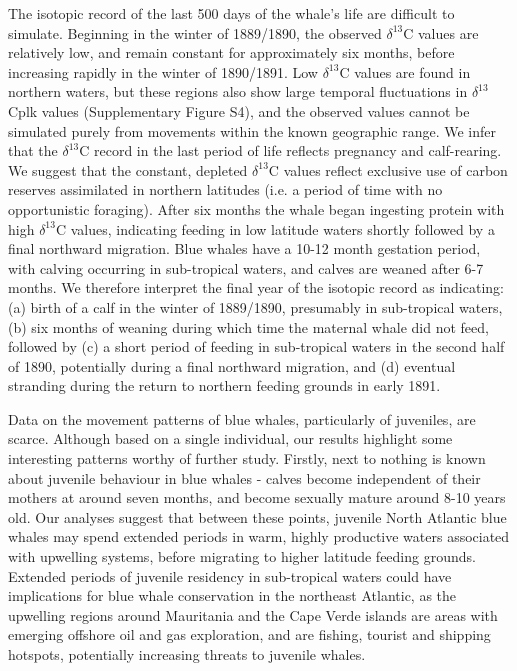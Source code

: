 \documentclass[a4paper,12pt]{article}
\begin{document}
The isotopic record of the last 500 days of the whale's life are difficult to simulate. 
Beginning in the winter of 1889/1890, the observed $\delta^{13}$C values are relatively low, and remain constant for approximately six months, before increasing rapidly in the winter of 1890/1891. 
Low $\delta^{13}$C values are found in northern waters, but these regions also show large temporal fluctuations in $\delta^{13}$Cplk values (Supplementary Figure S4), and the observed values cannot be simulated purely from movements within the known geographic range.
We infer that the $\delta^{13}$C record in the last period of life reflects pregnancy and calf-rearing. 
We suggest that the constant, depleted $\delta^{13}$C values reflect exclusive use of carbon reserves assimilated in northern latitudes (i.e. a period of time with no opportunistic foraging). 
After six months the whale began ingesting protein with high $\delta^{13}$C  values, indicating feeding in low latitude waters shortly followed by a final northward migration. 
Blue whales have a 10-12 month gestation period, with calving occurring in sub-tropical waters, and calves are weaned after 6-7 months\cite{handbook}. 
We therefore interpret the final year of the isotopic record as indicating: (a) birth of a calf in the winter of 1889/1890, presumably in sub-tropical waters, (b) six months of weaning during which time the maternal whale did not feed, followed by (c) a short period of feeding in sub-tropical waters in the second half of 1890, potentially during a final northward migration, and (d) eventual stranding during the return to northern feeding grounds in early 1891.

Data on the movement patterns of blue whales, particularly of juveniles, are scarce. 
Although based on a single individual, our results highlight some interesting patterns worthy of further study.
Firstly, next to nothing is known about juvenile behaviour in blue whales - calves become independent of their mothers at around seven months, and become sexually mature around 8-10 years old\cite{handbook}.
Our analyses suggest that between these points, juvenile North Atlantic blue whales may spend extended periods in warm, highly productive waters associated with upwelling systems, before migrating to higher latitude feeding grounds.
Extended periods of juvenile residency in sub-tropical waters could have implications for blue whale conservation in the northeast Atlantic, as the upwelling regions around Mauritania and the Cape Verde islands are areas with emerging offshore oil and gas exploration, and are fishing, tourist and shipping hotspots, potentially increasing threats to juvenile whales. 
\end{document}
